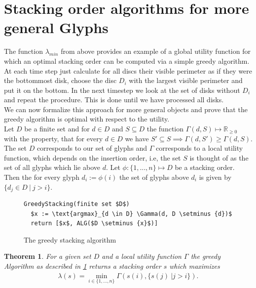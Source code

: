 \documentclass[a4paper,11pt]{article}
\newtheorem{theorem}{Theorem}
\begin{document}
\section{Stacking order algorithms for more general Glyphs}

The function $\lambda_{min}$ from above provides an example of a global utility function for which an optimal stacking order can be computed via a simple greedy algorithm. At each time step just calculate for all discs their visible perimeter as if they were the bottommost disk, choose the disc $D_i$ with the largest visible perimeter and put it on the bottom. In the next timestep we look at the set of disks without $D_i$ and repeat the procedure. This is done until we have processed all disks.\\

We can now formalize this approach for more general objects and prove that the greedy algorithm is optimal with respect to the utility.
\\

Let $D$ be a finite set and for $d \in D$ and $S \subseteq D$ the function $ \Gamma(d, S) \mapsto \mathbb{R}_{\geq 0} $ with the property, that for every $d \in D$ we have $S' \subseteq S \implies \Gamma(d, S') \geq \Gamma(d, S)$. \\
The set $D$ corresponds to our set of glyphs and $\Gamma$ corresponds to a local utility function, which depends on the insertion order, i.e, the set $S$ is thought of as the set of all glyphs which lie above $d$. Let $\phi: \{1,...,n\} \mapsto D$ be a stacking order. Then the for every glyph $d_i:=\phi(i)$ the set of glyphs above $d_i$ is given by $\{d_j\in D\ |\ j > i\}$.

\begin{figure}[H]
  \begin{lstlisting}[mathescape=true]
GreedyStacking(finite set $D$)
  $x := \text{argmax}_{d \in D} \Gamma(d, D \setminus {d})$
  return [$x$, ALG($D \setminus {x}$)]
  \end{lstlisting}
  \caption{The greedy stacking algorithm}
  \label{fig:greedyalg}
\end{figure}

\newpage

\begin{theorem}
  For a given set $D$ and a local utility function $\Gamma$ the greedy Algorithm as described in \ref{fig:greedyalg} returns a stacking order $s$ which maximizes\begin{align*}
    \lambda(s) = \min_{i \in \{1,\dots,n\}} \Gamma(s(i), \{s(j)\ | j > i\}).
  \end{align*}
\end{theorem}
\end{document}
